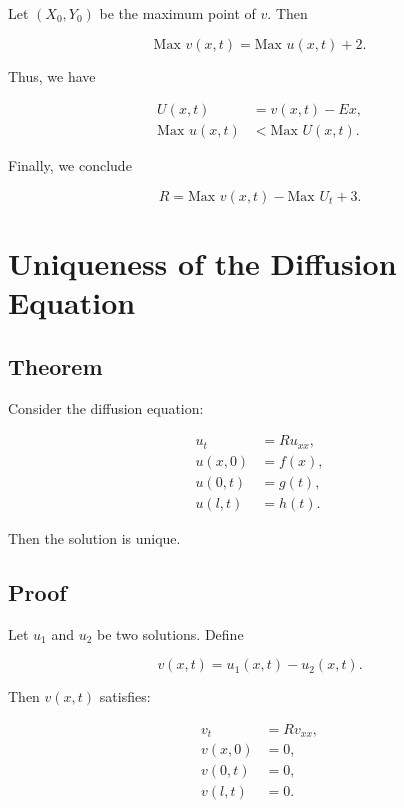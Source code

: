 \documentclass[11pt]{article}
\begin{document}
Let $(X_0, Y_0)$ be the maximum point of $v$. Then

\begin{equation}
    \text{Max } v(x, t) = \text{Max } u(x, t) + 2.
\end{equation}

Thus, we have

\begin{align}
    U(x, t) &= v(x, t) - E x, \\
    \text{Max } u(x, t) &< \text{Max } U(x, t).
\end{align}

Finally, we conclude

\begin{equation}
    R = \text{Max } v(x, t) - \text{Max } U_t + 3.
\end{equation}





\section*{Uniqueness of the Diffusion Equation}

\subsection*{Theorem}

Consider the diffusion equation:

\begin{align*}
    u_t &= R u_{xx}, \\
    u(x,0) &= f(x), \\
    u(0,t) &= g(t), \\
    u(l,t) &= h(t).
\end{align*}

Then the solution is unique.

\subsection*{Proof}

Let \( u_1 \) and \( u_2 \) be two solutions. Define

\[
v(x,t) = u_1(x,t) - u_2(x,t).
\]

Then \( v(x,t) \) satisfies:

\begin{align*}
    v_t &= R v_{xx}, \\
    v(x,0) &= 0, \\
    v(0,t) &= 0, \\
    v(l,t) &= 0.
\end{align*}
\end{document}
